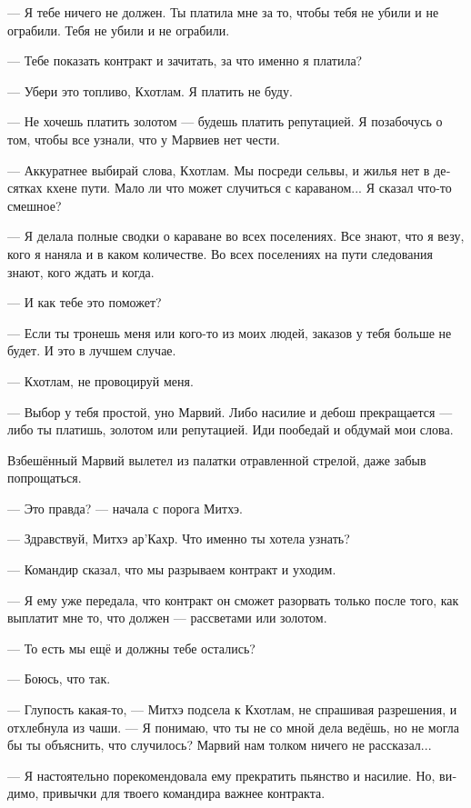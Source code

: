 \documentclass[a4paper,12pt,fleqn]{book}\usepackage{cooltooltips}\usepackage{polyglossia}\setdefaultlanguage{russian}\setotherlanguage{english}\defaultfontfeatures{Ligatures=TeX,Mapping=tex-text} \usepackage{xcolor}\definecolor{lightgray}{HTML}{bbbbbb}\color{lightgray}\newcommand{\ml}[3]{\textenglish{\textcolor{black}{#3}}}
\newcommand{\asterism}{\vspace{1em}{\centering\Large\bfseries$\ast~\ast~\ast$\par}\vspace{1em}}
\begin{document}
--- Я тебе ничего не должен.
Ты платила мне за то, чтобы тебя не убили и не ограбили.
Тебя не убили и не ограбили.

--- Тебе показать контракт и зачитать, за что именно я платила?

--- Убери это топливо, Кхотлам.
Я платить не буду.

--- Не хочешь платить золотом --- будешь платить репутацией.
Я позабочусь о том, чтобы все узнали, что у Марвиев нет чести.

--- Аккуратнее выбирай слова, Кхотлам.
Мы посреди сельвы, и жилья нет в десятках кхене пути.
Мало ли что может случиться с караваном...
Я сказал что-то смешное?

--- Я делала полные сводки о караване во всех поселениях.
Все знают, что я везу, кого я наняла и в каком количестве.
Во всех поселениях на пути следования знают, кого ждать и когда.

--- И как тебе это поможет?

--- Если ты тронешь меня или кого-то из моих людей, заказов у тебя больше не будет.
И это в лучшем случае.

--- Кхотлам, не провоцируй меня.

--- Выбор у тебя простой, уно Марвий.
Либо насилие и дебош прекращается --- либо ты платишь, золотом или репутацией.
Иди пообедай и обдумай мои слова.

Взбешённый Марвий вылетел из палатки отравленной стрелой, даже забыв попрощаться.

\asterism

--- Это правда? --- начала с порога Митхэ.

--- Здравствуй, Митхэ ар'Кахр.
Что именно ты хотела узнать?

--- Командир сказал, что мы разрываем контракт и уходим.

--- Я ему уже передала, что контракт он сможет разорвать только после того, как выплатит мне то, что должен --- рассветами или золотом.

--- То есть мы ещё и должны тебе остались?

--- Боюсь, что так.

--- Глупость какая-то, --- Митхэ подсела к Кхотлам, не спрашивая разрешения, и отхлебнула из чаши.
--- Я понимаю, что ты не со мной дела ведёшь, но не могла бы ты объяснить, что случилось?
Марвий нам толком ничего не рассказал...

--- Я настоятельно порекомендовала ему прекратить пьянство и насилие.
Но, видимо, привычки для твоего командира важнее контракта.
\end{document}
